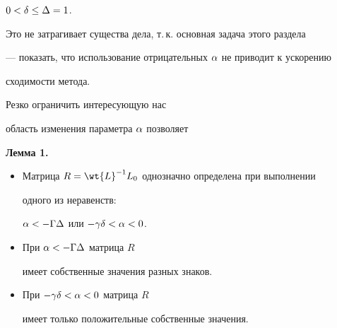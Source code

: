 $0 < \delta \leq \Delta=1$.


Это не затрагивает существа дела, т.\,к. основная задача этого раздела


--- показать, что использование отрицательных $\alpha$ не приводит к ускорению


сходимости метода.





Резко ограничить интересующую нас


область изменения параметра $\alpha$ позволяет


\medskip





{\bf Лемма 1.}{\it 


\begin{itemize}


\item[1)] Матрица $R=\wt{L}^{-1} L_0$ однозначно определена при выполнении 


одного из неравенств\/${:}$\linebreak


$\alpha < -\Gamma \Delta$ или $ -\gamma \delta < \alpha < 0$.


\item[2)] При $ \alpha < -\Gamma \Delta $ матрица $R$


имеет собственные значения разных знаков.


\item[3)] При $ -\gamma \delta < \alpha < 0 $ матрица $R$


имеет только положительные собственные значения.


\end{itemize}


}


\addtocounter{lem}{1}





